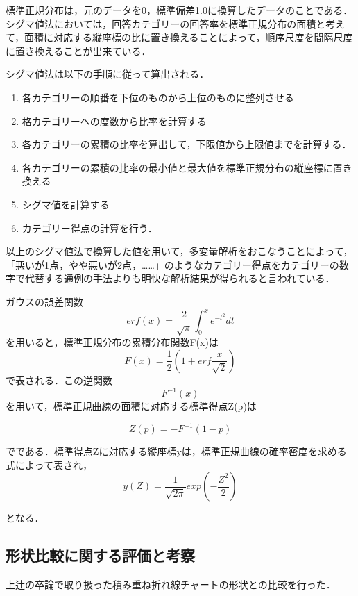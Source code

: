 \documentclass[shuuron]{kuee}
\begin{document}
標準正規分布は，元のデータを0，標準偏差1.0に換算したデータのことである．シグマ値法においては，回答カテゴリーの回答率を標準正規分布の面積と考えて，面積に対応する縦座標の比に置き換えることによって，順序尺度を間隔尺度に置き換えることが出来ている．

シグマ値法は以下の手順に従って算出される．
\begin{enumerate}
  \item 各カテゴリーの順番を下位のものから上位のものに整列させる
  \item 格カテゴリーへの度数から比率を計算する
  \item 各カテゴリーの累積の比率を算出して，下限値から上限値までを計算する．
  \item 各カテゴリーの累積の比率の最小値と最大値を標準正規分布の縦座標に置き換える
  \item シグマ値を計算する
  \item カテゴリー得点の計算を行う．
\end{enumerate}

以上のシグマ値法で換算した値を用いて，多変量解析をおこなうことによって，「悪いが1点，やや悪いが2点，……」のようなカテゴリー得点をカテゴリーの数字で代替する通例の手法よりも明快な解析結果が得られると言われている．

ガウスの誤差関数
\begin{equation}
  erf(x) = \frac{2}{\sqrt{\pi}}\int_0^x e^{-t^2} dt
\end{equation}
を用いると，標準正規分布の累積分布関数F(x)は
\begin{equation}
  F(x) = \frac{1}{2}(1+erf\frac{x}{\sqrt{2}})
\end{equation}
で表される．この逆関数\begin{equation}F^{-1}(x)\end{equation}を用いて，標準正規曲線の面積に対応する標準得点Z(p)は


\begin{equation}
  Z(p) = -F^{-1}(1-p)
\end{equation}

でである．標準得点Zに対応する縦座標yは，標準正規曲線の確率密度を求める式によって表され，
\begin{equation}
  y(Z)=\frac{1}{\sqrt{2\pi}}exp(-\frac{Z^2}{2})
\end{equation}

となる．






\subsection{形状比較に関する評価と考察}
上辻\cite{uetsuji}の卒論で取り扱った積み重ね折れ線チャートの形状との比較を行った．
\end{document}
